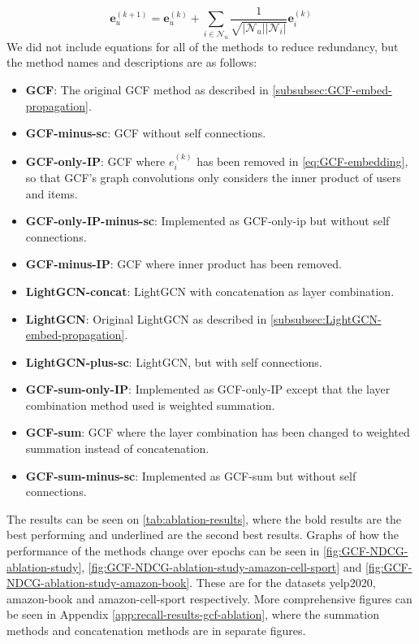 \begin{equation}
    \mathbf{e}_{u}^{(k+1)} = \mathbf{e}_{u}^{(k)} + \sum^{}_{i \in \mathcal{N}_u}  \frac{1}{\sqrt{|\mathcal{N}_u||\mathcal{N}_i|}} \mathbf{e}_i^{(k)}
    \label{eq:GCF-minus-IP}
\end{equation}
We did not include equations for all of the methods to reduce redundancy, but the method names and descriptions are as follows:
\begin{itemize}
    \item \textbf{GCF}: The original GCF method as described in \autoref{subsubsec:GCF-embed-propagation}.
    \item \textbf{GCF-minus-sc}: GCF without self connections.
    \item \textbf{GCF-only-IP}:  GCF where $e_i^{(k)}$ has been removed in \autoref{eq:GCF-embedding}, so that GCF's graph convolutions only considers the inner product of users and items.
    \item \textbf{GCF-only-IP-minus-sc}: Implemented as GCF-only-ip but without self connections.
    \item \textbf{GCF-minus-IP}: GCF where inner product has been removed.
    \item \textbf{LightGCN-concat}: LightGCN with concatenation as layer combination.
    \item \textbf{LightGCN}: Original LightGCN as described in \autoref{subsubsec:LightGCN-embed-propagation}.
    \item \textbf{LightGCN-plus-sc}: LightGCN, but with self connections.
    \item \textbf{GCF-sum-only-IP}: Implemented as GCF-only-IP except that the layer combination method used is weighted summation.
    \item \textbf{GCF-sum}: GCF where the layer combination has been changed to weighted summation instead of concatenation.
    \item \textbf{GCF-sum-minus-sc}: Implemented as GCF-sum but without self connections.
\end{itemize}
The results can be seen on \autoref{tab:ablation-results}, where the bold results are the best performing and underlined are the second best results.
Graphs of how the performance of the methods change over epochs can be seen in \autoref{fig:GCF-NDCG-ablation-study}, \autoref{fig:GCF-NDCG-ablation-study-amazon-cell-sport} and \autoref{fig:GCF-NDCG-ablation-study-amazon-book}.
These are for the datasets yelp2020, amazon-book and amazon-cell-sport respectively.
More comprehensive figures can be seen in Appendix \ref{app:recall-results-gcf-ablation}, where the summation methods and concatenation methods are in separate figures.
